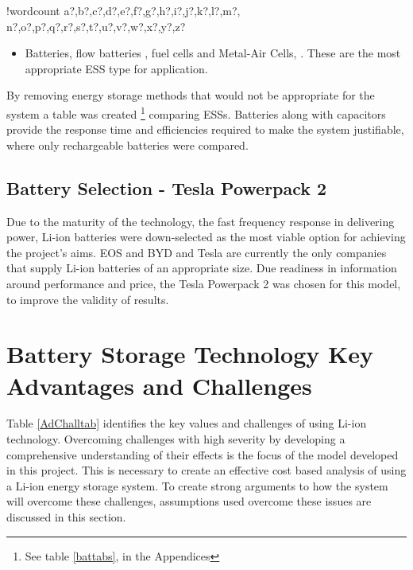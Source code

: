 \documentclass[fontsize=9.5pt]{extarticle}
\numberwithin{figure}{section} %
\providecommand{\tightlist}{%
  \setlength{\itemsep}{0pt}\setlength{\parskip}{0pt}}
\newcounter{words}
\newenvironment{counted}{%
  \setcounter{words}{0}
  \SearchList!{wordcount}{\stepcounter{words}}
    {a?,b?,c?,d?,e?,f?,g?,h?,i?,j?,k?,l?,m?,
    n?,o?,p?,q?,r?,s?,t?,u?,v?,w?,x?,y?,z?}
  \UndoBoundary{'}
  \SearchOrder{p;}}{%
  \StopSearching}
\begin{document}
\begin{counted}
\begin{itemize}
  \begin{itemize}
  \tightlist
  \item
    Batteries, flow batteries \cite{flowbatstan}, fuel cells and
    Metal-Air Cells\cite{Chen2009291}, \cite{batuni}. These are the most
    appropriate ESS type for application.
  \end{itemize}
\end{itemize}

By removing energy storage methods that would not be appropriate for the
system a table was created
\footnote{See table \ref{battabs}, in the Appendices} comparing ESSs.
Batteries along with capacitors provide the response time
\cite{Choudar201521} and efficiencies required to make the system
justifiable, where only rechargeable batteries were compared.

\subsection{Battery Selection - Tesla Powerpack
2}\label{battery-selection---tesla-powerpack-2}

Due to the maturity of the technology, the fast frequency response in
delivering power, Li-ion batteries were down-selected as the most viable
option for achieving the project's aims. EOS and BYD and Tesla are
currently the only companies that supply Li-ion batteries of an
appropriate size. Due readiness in information around performance and
price, the Tesla Powerpack 2 was chosen for this model, to improve the
validity of results.

\section{Battery Storage Technology Key Advantages and
Challenges}\label{battery-storage-technology-key-advantages-and-challenges}

Table \ref{AdChalltab} identifies the key values and challenges of using
Li-ion technology. Overcoming challenges with high severity by
developing a comprehensive understanding of their effects is the focus
of the model developed in this project. This is necessary to create an
effective cost based analysis of using a Li-ion energy storage system.
To create strong arguments to how the system will overcome these
challenges, assumptions used overcome these issues are discussed in this
section.


\end{counted}
\end{document}
